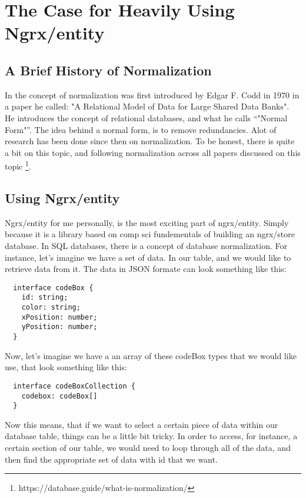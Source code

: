 \maketitle{}
\section{ The Case for Heavily Using Ngrx/entity }

\subsection{ A Brief History of Normalization}
In the concept of normalization was first introduced by Edgar F. Codd in 1970
in a paper he called: "A Relational Model of Data for Large Shared Data Banks".
He introduces the concept of relational databases, and what he calls ``"Normal
Form"''. The idea behind a normal form, is to remove redundancies. Alot of
research has been done since then on normalization. To be honest, there is quite
a bit on this topic, and following normalization across all papers discussed on
this topic \footnote{https://database.guide/what-is-normalization/}.

\subsection{Using Ngrx/entity}
Ngrx/entity for me personally, is the most exciting part of ngrx/entity. Simply
because it is a library based on comp sci fundementals of building an ngrx/store
database. In SQL databases, there is a concept of database normalization. For
instance, let's imagine we have a set of data. In our table, and we would like
to retrieve data from it. The data in JSON formate can look something like this:
\begin{lstlisting}
  interface codeBox {
    id: string;
    color: string;
    xPosition: number;
    yPosition: number;
  }
\end{lstlisting}

Now, let's imagine we have a an array of these codeBox types that we would like
use, that look something like this:
\begin{lstlisting}
  interface codeBoxCollection {
    codebox: codeBox[]
  }
\end{lstlisting}

Now this means, that if we want to select a certain piece of data within our
database table, things can be a little bit tricky. In order to access, for
instance, a certain section of our table, we would need to loop through all of
the data, and then find the appropriate set of data with id that we want.


